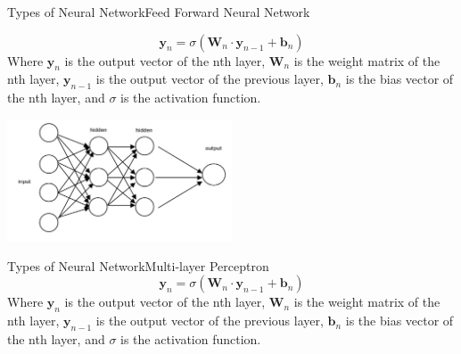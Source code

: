\documentclass{beamer}
\begin{document}
\begin{frame}{Types of Neural Network}{Feed Forward Neural Network}
\begin{multicols}{2}
    \begin{equation}
        \textbf{y}_n=\sigma{(\textbf{W}_n\cdot\textbf{y}_{n-1} + \textbf{b}_n)}
    \end{equation}
    Where $\textbf{y}_n$ is the output vector of the nth layer, $\textbf{W}_n$ is the weight matrix of the nth layer, $\textbf{y}_{n-1}$ is the output vector of the previous layer, $\textbf{b}_n$ is the bias vector of the nth layer, and $\sigma$ is the activation function.
    \begin{center}
        \includegraphics[width=0.5\textwidth]{images/feed forward}
    \end{center}
\end{multicols}
\end{frame}

\begin{frame}{Types of Neural Network}{Multi-layer Perceptron}
    \begin{equation}
        \textbf{y}_n=\sigma{(\textbf{W}_n\cdot\textbf{y}_{n-1} + \textbf{b}_n)}
    \end{equation}
    Where $\textbf{y}_n$ is the output vector of the nth layer, $\textbf{W}_n$ is the weight matrix of the nth layer, $\textbf{y}_{n-1}$ is the output vector of the previous layer, $\textbf{b}_n$ is the bias vector of the nth layer, and $\sigma$ is the activation function.
\end{frame}
\end{document}
